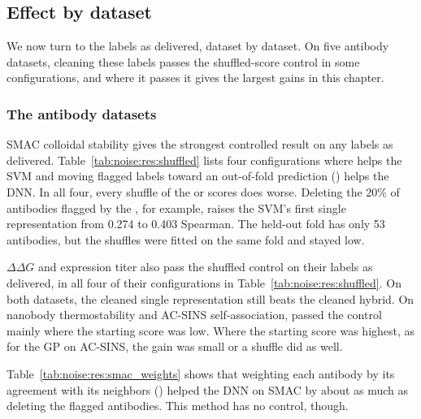 \subsection{Effect by dataset}\label{sec:noise:res:dataset}

We now turn to the labels as delivered, dataset by dataset. On five antibody datasets, cleaning these labels passes the shuffled-score control in some configurations, and where it passes it gives the largest gains in this chapter.

\subsubsection{The antibody datasets}\label{sec:noise:res:antibodies}

SMAC colloidal stability gives the strongest controlled result on any labels as delivered. Table~\ref{tab:noise:res:shuffled} lists four configurations where  helps the SVM and moving flagged labels toward an out-of-fold prediction () helps the DNN. In all four, every shuffle of the  or  scores does worse. Deleting the 20\% of antibodies flagged by the , for example, raises the SVM's first single representation from 0.274 to 0.403 Spearman. The held-out fold has only 53 antibodies, but the shuffles were fitted on the same fold and stayed low.

$\Delta\Delta G$ and expression titer also pass the shuffled control on their labels as delivered, in all four of their configurations in Table~\ref{tab:noise:res:shuffled}. On both datasets, the cleaned single representation still beats the cleaned hybrid. On nanobody thermostability and AC-SINS self-association,  passed the control mainly where the starting score was low. Where the starting score was highest, as for the GP on AC-SINS, the gain was small or a shuffle did as well.

Table~\ref{tab:noise:res:smac_weights} shows that weighting each antibody by its agreement with its neighbors () helped the DNN on SMAC by about as much as deleting the flagged antibodies. This method has no control, though.

